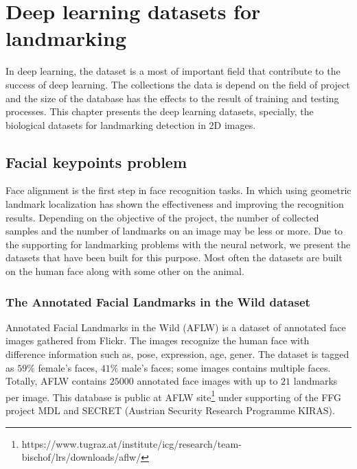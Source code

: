 \chapter{Deep learning datasets for landmarking}
In deep learning, the dataset is a most of important field that contribute to the success of deep learning. The collections the data is depend on the field of project and the size of the database has the effects to the result of training and testing processes. This chapter presents the deep learning datasets, specially, the biological datasets for landmarking detection in 2D images. 
\section{Facial keypoints problem}
Face alignment is the first step in face recognition tasks. In which using geometric landmark localization has shown the effectiveness and improving the recognition results. Depending on the objective of the project, the number of collected samples and the number of landmarks on an image may be less or more. Due to the supporting for landmarking problems with the neural network, we present the datasets that have been built for this purpose. Most often the datasets are built on the human face along with some other on the animal.

\subsection{The Annotated Facial Landmarks in the Wild dataset}
Annotated Facial Landmarks in the Wild (AFLW) \cite{koestinger11a} is a dataset of annotated face images gathered from Flickr. The images recognize the human face with difference  information such as, pose, expression, age, gener. The dataset is tagged as  $59\%$ female's faces, $41\%$  male's faces; some images contains multiple faces. Totally, AFLW contains $25000$ annotated face images with up to $21$ landmarks per image. This database is public at AFLW site\footnote{https://www.tugraz.at/institute/icg/research/team-bischof/lrs/downloads/aflw/} under supporting of the FFG project MDL and SECRET (Austrian Security Research Programme KIRAS).
